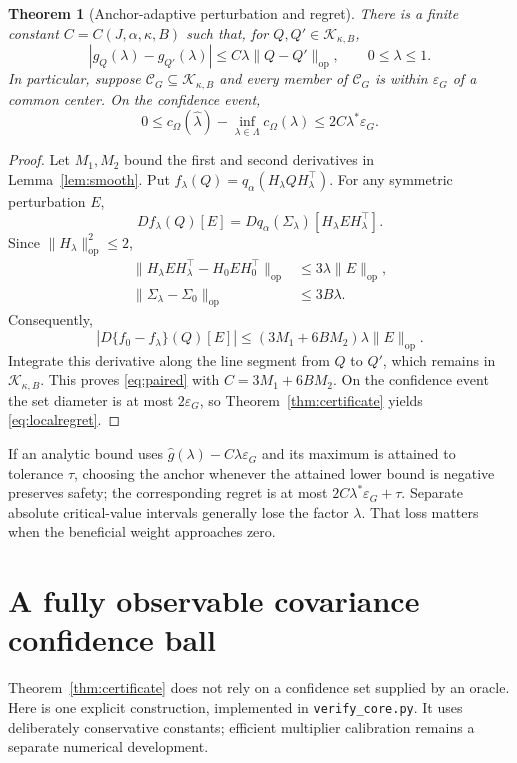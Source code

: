 \documentclass[11pt]{article}
\newtheorem{theorem}{Theorem}
\theoremstyle{remark}\newtheorem{remark}[theorem]{Remark}
\newcommand{\op}{\mathrm{op}}
\newcommand{\calC}{\mathcal C}
\begin{document}
\begin{theorem}[Anchor-adaptive perturbation and regret]\label{thm:paired}
There is a finite constant $C=C(J,\alpha,\kappa,B)$ such that, for $Q,Q'\in\mathcal K_{\kappa,B}$,
\begin{equation}
 |g_Q(\lambda)-g_{Q'}(\lambda)|
 \leq C\lambda\|Q-Q'\|_\op,\qquad 0\leq\lambda\leq1.
 \label{eq:paired}
\end{equation}
In particular, suppose $\calC_G\subseteq\mathcal K_{\kappa,B}$ and every member of $\calC_G$ is within $\varepsilon_G$ of a common center. On the confidence event,
\begin{equation}
 0\leq c_\Omega(\widehat\lambda)-\inf_{\lambda\in\Lambda}c_\Omega(\lambda)
 \leq2C\lambda^*\varepsilon_G.
 \label{eq:localregret}
\end{equation}
\end{theorem}
\begin{proof}
Let $M_1,M_2$ bound the first and second derivatives in Lemma~\ref{lem:smooth}. Put $f_\lambda(Q)=q_\alpha(H_\lambda QH_\lambda^\top)$.
For any symmetric perturbation $E$,
\[
 Df_\lambda(Q)[E]=Dq_\alpha(\Sigma_\lambda)[H_\lambda EH_\lambda^\top].
\]
Since $\|H_\lambda\|_\op^2\leq2$,
\begin{align*}
 \|H_\lambda EH_\lambda^\top-H_0EH_0^\top\|_\op&\leq3\lambda\|E\|_\op,\\
 \|\Sigma_\lambda-\Sigma_0\|_\op&\leq3B\lambda.
\end{align*}
Consequently,
\[
 |D\{f_0-f_\lambda\}(Q)[E]|
 \leq(3M_1+6BM_2)\lambda\|E\|_\op.
\]
Integrate this derivative along the line segment from $Q$ to $Q'$, which remains in $\mathcal K_{\kappa,B}$. This proves \eqref{eq:paired} with $C=3M_1+6BM_2$. On the confidence event the set diameter is at most $2\varepsilon_G$, so Theorem~\ref{thm:certificate} yields \eqref{eq:localregret}.
\end{proof}

If an analytic bound uses $\widehat g(\lambda)-C\lambda\varepsilon_G$ and its maximum is attained to tolerance $\tau$, choosing the anchor whenever the attained lower bound is negative preserves safety; the corresponding regret is at most $2C\lambda^*\varepsilon_G+\tau$.
Separate absolute critical-value intervals generally lose the factor $\lambda$. That loss matters when the beneficial weight approaches zero.

\section{A fully observable covariance confidence ball}
Theorem~\ref{thm:certificate} does not rely on a confidence set supplied by an oracle. Here is one explicit construction, implemented in \texttt{verify\_core.py}. It uses deliberately conservative constants; efficient multiplier calibration remains a separate numerical development.
\end{document}
